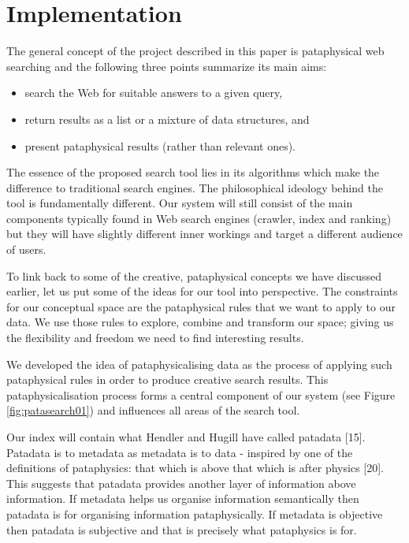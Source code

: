 \section{Implementation}

The general concept of the project described in this paper is pataphysical web searching and the following three points summarize its main aims:

\begin{itemize}
  \item search the Web for suitable answers to a given query,
  \item return results as a list or a mixture of data structures, and
  \item present pataphysical results (rather than relevant ones).
\end{itemize}

The essence of the proposed search tool lies in its algorithms which make the difference to traditional search engines. The philosophical ideology behind the tool is fundamentally different. Our system will still consist of the main components typically found in Web search engines (crawler, index and ranking) but they will have slightly different inner workings and target a different audience of users.

To link back to some of the creative, pataphysical concepts we have discussed earlier, let us put some of the ideas for our tool into perspective. The constraints for our conceptual space are the pataphysical rules that we want to apply to our data. We use those rules to explore, combine and transform our space; giving us the flexibility and freedom we need to find interesting results.

We developed the idea of pataphysicalising data as the process of applying such pataphysical rules in order to produce creative search results. This pataphysicalisation process forms a central component of our system (see Figure \ref{fig:patasearch01}) and influences all areas of the search tool.

Our index will contain what Hendler and Hugill have called patadata [15].  Patadata is to metadata as metadata is to data - inspired by one of the definitions of pataphysics: that which is above that which is after physics [20]. This suggests that patadata provides another layer of information above information.  If metadata helps us organise information semantically then patadata is for organising information pataphysically. If metadata is objective then patadata is subjective and that is precisely what pataphysics is for.

